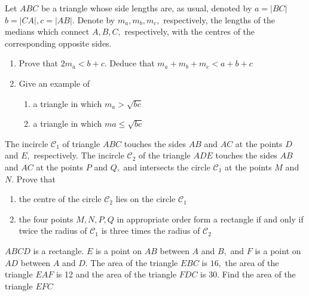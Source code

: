 \documentclass{pset}
\begin{document}
\begin{problems}
\begin{problem}[IrMO 2011 Q2]
    Let \(A B C\) be a triangle whose side lengths are, as usual, denoted by \(a=|B C|\) \(b=|C A|, c=|A B| .\) Denote by \(m_{a}, m_{b}, m_{c},\) respectively, the lengths of the medians which connect \(A, B, C,\) respectively, with the centres of the corresponding opposite sides.
    \begin{enumerate}
        \item Prove that \(2 m_{a}<b+c .\) Deduce that \(m_{a}+m_{b}+m_{c}<a+b+c\)
    \item Give an example of
    \begin{enumerate}
    \item a triangle in which \(m_{a}>\sqrt{b c}\)
    \item a triangle in which \(m a \leq \sqrt{b c}\)
    \end{enumerate} 
    \end{enumerate}
\end{problem}

\begin{problem}[IrMO 2011 Q4]
    The incircle \(\mathcal{C}_{1}\) of triangle \(A B C\) touches the sides \(A B\) and \(A C\) at the points \(D\) and \(E,\) respectively. The incircle \(\mathcal{C}_{2}\) of the triangle \(A D E\) touches the sides \(A B\) and \(A C\) at the points \(P\) and \(Q,\) and intersects the circle \(\mathcal{C}_{1}\) at the points \(M\) and \(N .\) Prove that
    \begin{enumerate}
        \item the centre of the circle \(\mathcal{C}_{2}\) lies on the circle \(\mathcal{C}_{1}\)
        \item the four points \(M, N, P, Q\) in appropriate order form a rectangle if and only if twice the radius of \(\mathcal{C}_{1}\) is three times the radius of \(\mathcal{C}_{2}\)
     
    \end{enumerate}
\end{problem}

\begin{problem}[IrMO 2011 Q8]
    \(A B C D\) is a rectangle. \(E\) is a point on \(A B\) between \(A\) and \(B,\) and \(F\) is a point on
    \(A D\) between \(A\) and \(D .\) The area of the triangle \(E B C\) is \(16,\) the area of the triangle \(E A F\) is 12 and the area of the triangle \(F D C\) is \(30 .\) Find the area of the triangle \(E F C\)
\end{problem}


\end{problems}
\end{document}
